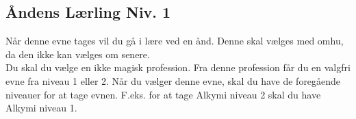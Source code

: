 \subsection*{Åndens Lærling Niv. 1}
Når denne evne tages vil du gå i lære ved en ånd. Denne skal vælges med omhu, da den ikke kan vælges om senere.\\
Du skal du vælge en ikke magisk profession. Fra denne profession får du en valgfri evne fra niveau 1 eller 2. Når du vælger denne evne, skal du have de foregående niveauer for at tage evnen. F.eks. for at tage Alkymi niveau 2 skal du have Alkymi niveau 1.

